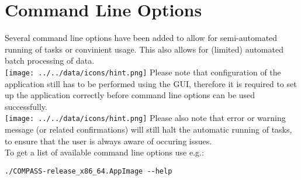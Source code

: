 
\section{Command Line Options}
\label{sec:command_line} 

Several command line options have been added to allow for semi-automated running of tasks or convinient usage. This also allows for (limited) automated batch processing of data. \\

\texttt{[image: ../../data/icons/hint.png]} Please note that configuration of the application still has to be performed using the GUI, therefore it is required to set up the application correctly before command line options can be used successfully.\\

\texttt{[image: ../../data/icons/hint.png]} Please also note that error or warning message (or related confirmations) will still halt the automatic running of tasks, to ensure that the user is always aware of occuring issues. \\

To get a list of available command line options use e.g.:
\begin{lstlisting}
./COMPASS-release_x86_64.AppImage --help
\end{lstlisting}

